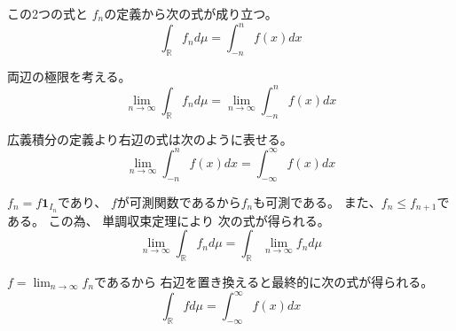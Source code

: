 \documentclass[12pt,b5paper]{ltjsarticle}
\begin{document}
\begin{enumerate}
      この2つの式と
      $f_{n}$の定義から次の式が成り立つ。
      \begin{equation}
       \int_{\mathbb{R}} f_{n} d \mu
       = \int_{-n}^{n} f(x) dx
      \end{equation}

      両辺の極限を考える。
      \begin{equation}
       \lim_{n\to\infty}
        \int_{\mathbb{R}} f_{n} d \mu
        =
        \lim_{n\to\infty}
        \int_{-n}^{n} f(x) dx
      \end{equation}

      広義積分の定義より右辺の式は次のように表せる。
      \begin{equation}
        \lim_{n\to\infty} \int_{-n}^{n}f(x)dx
        = \int_{-\infty}^{\infty}f(x)dx
      \end{equation}


      $f_{n}=f\mathbf{1}_{I_{n}}$であり、
      $f$が可測関数であるから$f_{n}$も可測である。
      また、$f_{n}\leq f_{n+1}$である。
      この為、
      単調収束定理により
      次の式が得られる。
      \begin{equation}
       \lim_{n\to\infty} \int_{\mathbb{R}}f_{n} d\mu
        = \int_{\mathbb{R}} \lim_{n\to\infty}f_{n} d\mu
      \end{equation}


      $f=\lim_{n\to\infty}f_{n}$であるから
      右辺を置き換えると最終的に次の式が得られる。
      \begin{equation}
       \int_{\mathbb{R}} f d\mu
        = \int_{-\infty}^{\infty}f(x)dx
      \end{equation}


      \hrulefill

\end{enumerate}

\hrulefill
\end{document}
